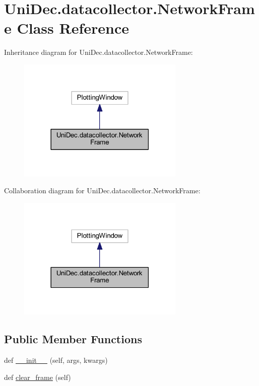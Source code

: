 \hypertarget{class_uni_dec_1_1datacollector_1_1_network_frame}{}\section{Uni\+Dec.\+datacollector.\+Network\+Frame Class Reference}
\label{class_uni_dec_1_1datacollector_1_1_network_frame}


Inheritance diagram for Uni\+Dec.\+datacollector.\+Network\+Frame\+:\nopagebreak
\begin{figure}[H]
\begin{center}
\leavevmode
\includegraphics[width=225pt]{class_uni_dec_1_1datacollector_1_1_network_frame__inherit__graph}
\end{center}
\end{figure}


Collaboration diagram for Uni\+Dec.\+datacollector.\+Network\+Frame\+:\nopagebreak
\begin{figure}[H]
\begin{center}
\leavevmode
\includegraphics[width=225pt]{class_uni_dec_1_1datacollector_1_1_network_frame__coll__graph}
\end{center}
\end{figure}
\subsection*{Public Member Functions}
\begin{DoxyCompactItemize}
\item 
def \hyperlink{class_uni_dec_1_1datacollector_1_1_network_frame_a21dd2d83dd2ca3ce0ba8809c83cacdb2}{\+\_\+\+\_\+init\+\_\+\+\_\+} (self, args, kwargs)
\item 
def \hyperlink{class_uni_dec_1_1datacollector_1_1_network_frame_a6aea074a8666ff5e361b56c9ac90988d}{clear\+\_\+frame} (self)
\end{DoxyCompactItemize}
